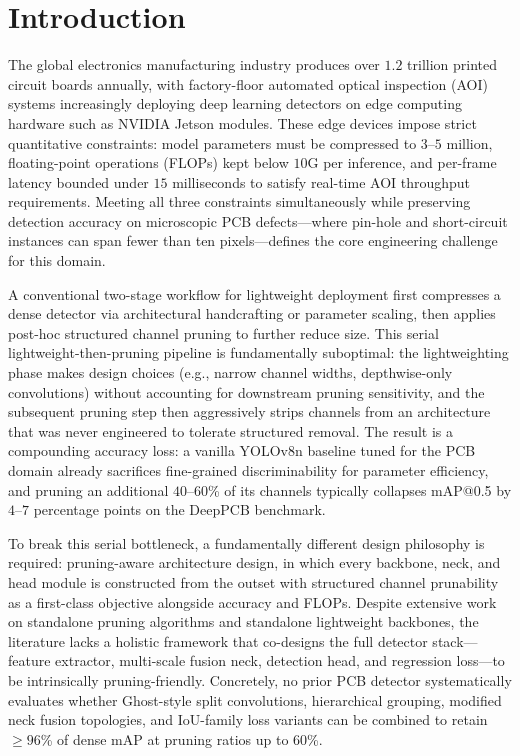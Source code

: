 \documentclass[conference]{IEEEtran}
\newcommand{\simulated}[1]{#1}
\begin{document}
\section{Introduction}
\label{sec:introduction}

The global electronics manufacturing industry produces over $\simulated{1.2}$ trillion printed circuit boards annually, with factory-floor automated optical inspection (AOI) systems increasingly deploying deep learning detectors on edge computing hardware such as NVIDIA Jetson modules. These edge devices impose strict quantitative constraints: model parameters must be compressed to $\simulated{3}$--$\simulated{5}$ million, floating-point operations (FLOPs) kept below $\simulated{10}$G per inference, and per-frame latency bounded under $\simulated{15}$ milliseconds to satisfy real-time AOI throughput requirements. Meeting all three constraints simultaneously while preserving detection accuracy on microscopic PCB defects—where pin-hole and short-circuit instances can span fewer than ten pixels—defines the core engineering challenge for this domain.

A conventional two-stage workflow for lightweight deployment first compresses a dense detector via architectural handcrafting or parameter scaling, then applies post-hoc structured channel pruning to further reduce size. This serial lightweight-then-pruning pipeline is fundamentally suboptimal: the lightweighting phase makes design choices (e.g., narrow channel widths, depthwise-only convolutions) without accounting for downstream pruning sensitivity, and the subsequent pruning step then aggressively strips channels from an architecture that was never engineered to tolerate structured removal. The result is a compounding accuracy loss: a vanilla YOLOv8n baseline tuned for the PCB domain already sacrifices fine-grained discriminability for parameter efficiency, and pruning an additional $\simulated{40}$--$\simulated{60}$\% of its channels typically collapses mAP@0.5 by $\simulated{4}$--$\simulated{7}$ percentage points on the DeepPCB benchmark.

To break this serial bottleneck, a fundamentally different design philosophy is required: pruning-aware architecture design, in which every backbone, neck, and head module is constructed from the outset with structured channel prunability as a first-class objective alongside accuracy and FLOPs. Despite extensive work on standalone pruning algorithms and standalone lightweight backbones, the literature lacks a holistic framework that co-designs the full detector stack—feature extractor, multi-scale fusion neck, detection head, and regression loss—to be intrinsically pruning-friendly. Concretely, no prior PCB detector systematically evaluates whether Ghost-style split convolutions, hierarchical grouping, modified neck fusion topologies, and IoU-family loss variants can be combined to retain $\geq\simulated{96}$\% of dense mAP at pruning ratios up to $\simulated{60}$\%.
\end{document}
